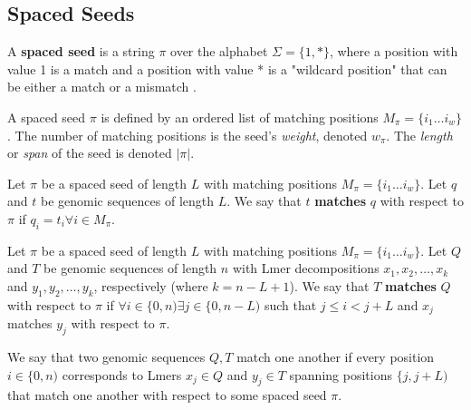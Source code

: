 \subsection{Spaced Seeds}
\begin{defn}
A \textbf{spaced seed} is a string $\pi$ over the alphabet $\Sigma =\lbrace 1,* \rbrace$, where a position with value 1 is a match and a position with value * is a "wildcard position" that can be either a match or a mismatch \cite{chao2008sequence}. \end{defn}

A spaced seed $\pi$ is defined by an ordered list of matching positions $M_{\pi} = \lbrace i_{1} \dotsc i_{w} \rbrace$ \cite{buhler2005designing}. The number of matching positions is the seed's \textit{weight}, denoted $w_{\pi}$. The \textit{length} or \textit{span} of the seed is denoted $\lvert \pi \rvert$.

\begin{defn}
Let $\pi$ be a spaced seed of length $L$ with matching positions $M_{\pi} = \lbrace i_{1} \dotsc i_{w} \rbrace$. Let $q$ and $t$ be genomic sequences of length $L$. We say that $t$ \textbf{matches} $q$ with respect to $\pi$ if $q_{i} = t_{i} \forall i \in M_{\pi}$.
\end{defn}

\begin{defn}
Let $\pi$ be a spaced seed of length $L$ with matching positions $M_{\pi} = \lbrace i_{1} \dotsc i_{w} \rbrace$. Let $Q$ and $T$ be genomic sequences of length $n$ with Lmer decompositions $x_{1},x_{2},\dotsc ,x_{k}$ and $y_{1},y_{2},\dotsc ,y_{k}$, respectively (where $k = n - L + 1$). We say that $T$ \textbf{matches} $Q$ with respect to $\pi$ if $\forall i \in \lbrace 0, n) \exists j \in \lbrace 0, n-L)$ such that $j \leq i < j+L$ and $x_{j}$ matches $y_{j}$ with respect to $\pi$.
\end{defn}

We say that two genomic sequences $Q,T$ match one another if every position $i \in \lbrace 0,n)$ corresponds to Lmers $x_{j} \in Q$ and $y_{j} \in T$ spanning positions $\lbrace j,j+L)$ that match one another with respect to some spaced seed $\pi$. 